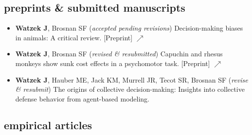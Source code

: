 \documentclass[]{friggeri-cv}
\begin{document}

\subsection{preprints \& submitted manuscripts}

\begin{itemize}[align=center]
  \item {\textbf{Watzek J}, Brosnan SF (\emph{accepted pending revisions}) Decision-making biases in animals: A critical review. [Preprint] \href{https://doi.org/10.31219/osf.io/4gu2f}{\small $\nearrow$}} 
  \item {\textbf{Watzek J}, Brosnan SF (\emph{revised \& resubmitted}) Capuchin and rhesus monkeys show sunk cost effects in a psychomotor task. [Preprint] \href{https://doi.org/10.31234/osf.io/qtgru}{\small $\nearrow$}} 
  \item \textbf{Watzek J}, Hauber ME, Jack KM, Murrell JR, Tecot SR, Brosnan SF (\emph{revise \& resubmit}) The origins of collective decision-making: Insights into collective defense behavior from agent-based modeling.

\end{itemize}


\subsection{empirical articles}
\end{document}
